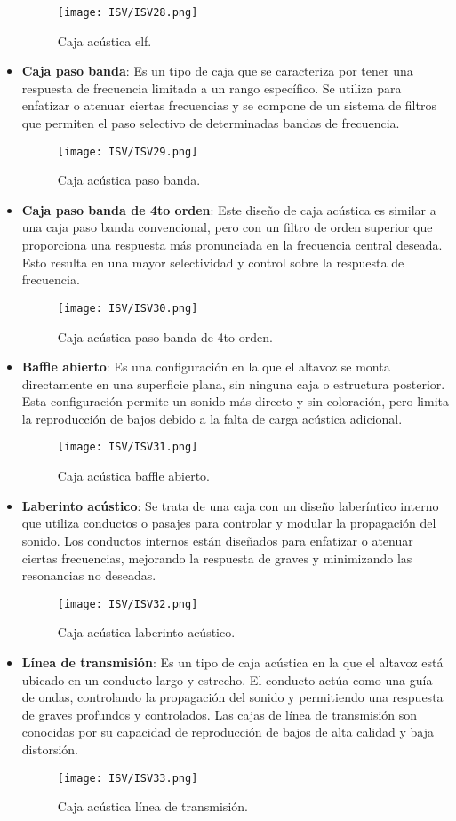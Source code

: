 \documentclass[
	12pt, %
	fleqn, %
	a4paper, %
	oneside, %
]{LegrandOrangeBook}
\begin{document}
\begin{itemize}
\begin{figure}[H]
\centering
\texttt{[image: ISV/ISV28.png]}
\caption{Caja acústica elf.}
\end{figure}
\item \textbf{Caja paso banda}: Es un tipo de caja que se caracteriza por tener una respuesta de frecuencia limitada a un rango específico. Se utiliza para enfatizar o atenuar ciertas frecuencias y se compone de un sistema de filtros que permiten el paso selectivo de determinadas bandas de frecuencia.
\begin{figure}[H]
\centering
\texttt{[image: ISV/ISV29.png]}
\caption{Caja acústica paso banda.}
\end{figure}
\item \textbf{Caja paso banda de 4to orden}: Este diseño de caja acústica es similar a una caja paso banda convencional, pero con un filtro de orden superior que proporciona una respuesta más pronunciada en la frecuencia central deseada. Esto resulta en una mayor selectividad y control sobre la respuesta de frecuencia.
\begin{figure}[H]
\centering
\texttt{[image: ISV/ISV30.png]}
\caption{Caja acústica paso banda de 4to orden.}
\end{figure}
\item \textbf{Baffle abierto}: Es una configuración en la que el altavoz se monta directamente en una superficie plana, sin ninguna caja o estructura posterior. Esta configuración permite un sonido más directo y sin coloración, pero limita la reproducción de bajos debido a la falta de carga acústica adicional.
\begin{figure}[H]
\centering
\texttt{[image: ISV/ISV31.png]}
\caption{Caja acústica baffle abierto.}
\end{figure}
\item \textbf{Laberinto acústico}: Se trata de una caja con un diseño laberíntico interno que utiliza conductos o pasajes para controlar y modular la propagación del sonido. Los conductos internos están diseñados para enfatizar o atenuar ciertas frecuencias, mejorando la respuesta de graves y minimizando las resonancias no deseadas.
\begin{figure}[H]
\centering
\texttt{[image: ISV/ISV32.png]}
\caption{Caja acústica laberinto acústico.}
\end{figure}
\item \textbf{Línea de transmisión}: Es un tipo de caja acústica en la que el altavoz está ubicado en un conducto largo y estrecho. El conducto actúa como una guía de ondas, controlando la propagación del sonido y permitiendo una respuesta de graves profundos y controlados. Las cajas de línea de transmisión son conocidas por su capacidad de reproducción de bajos de alta calidad y baja distorsión.
\begin{figure}[H]
\centering
\texttt{[image: ISV/ISV33.png]}
\caption{Caja acústica línea de transmisión.}
\end{figure}
\end{itemize}
\end{document}
